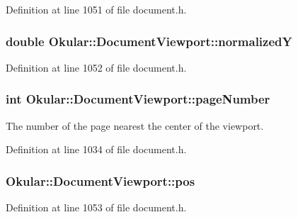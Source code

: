 Definition at line 1051 of file document.\+h.

\hypertarget{classOkular_1_1DocumentViewport_aa86271c42d62ef102c6ba570bf40e770}{
\subsubsection[{normalized\+Y}]{\setlength{\rightskip}{0pt plus 5cm}double Okular\+::\+Document\+Viewport\+::normalized\+Y}}\label{classOkular_1_1DocumentViewport_aa86271c42d62ef102c6ba570bf40e770}


Definition at line 1052 of file document.\+h.

\hypertarget{classOkular_1_1DocumentViewport_a122674d4a493e79b1aa5fd5c00e81c93}{
\subsubsection[{page\+Number}]{\setlength{\rightskip}{0pt plus 5cm}int Okular\+::\+Document\+Viewport\+::page\+Number}}\label{classOkular_1_1DocumentViewport_a122674d4a493e79b1aa5fd5c00e81c93}
The number of the page nearest the center of the viewport. 

Definition at line 1034 of file document.\+h.

\hypertarget{classOkular_1_1DocumentViewport_a013c8cd543d57045791fe054da340a0e}{
\subsubsection[{pos}]{ Okular\+::\+Document\+Viewport\+::pos}}\label{classOkular_1_1DocumentViewport_a013c8cd543d57045791fe054da340a0e}


Definition at line 1053 of file document.\+h.

